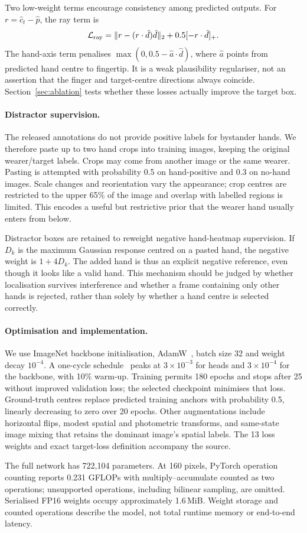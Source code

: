 Two low-weight terms encourage consistency among predicted outputs. For $r=\hat c_t-\hat p$, the ray term is
\begin{equation}
 \mathcal L_{\rm ray}
 =\|r-(r\cdot\hat d)\hat d\|_2
   +0.5[-r\cdot\hat d]_+ .
 \label{eq:rayloss}
\end{equation}
The hand-axis term penalises $\max(0,0.5-\hat a\cdot\hat d)$, where $\hat a$ points from predicted hand centre to fingertip. It is a weak plausibility regulariser, not an assertion that the finger and target-centre directions always coincide. Section~\ref{sec:ablation} tests whether these losses actually improve the target box.

\paragraph{Distractor supervision.}
The released annotations do not provide positive labels for bystander hands. We therefore paste up to two hand crops into training images, keeping the original wearer/target labels. Crops may come from another image or the same wearer. Pasting is attempted with probability 0.5 on hand-positive and 0.3 on no-hand images. Scale changes and reorientation vary the appearance; crop centres are restricted to the upper 65\% of the image and overlap with labelled regions is limited. This encodes a useful but restrictive prior that the wearer hand usually enters from below.

Distractor boxes are retained to reweight negative hand-heatmap supervision. If $D_k$ is the maximum Gaussian response centred on a pasted hand, the negative weight is $1+4D_k$. The added hand is thus an explicit negative reference, even though it looks like a valid hand. This mechanism should be judged by whether localisation survives interference and whether a frame containing only other hands is rejected, rather than solely by whether a hand centre is selected correctly.

\paragraph{Optimisation and implementation.}
We use ImageNet backbone initialisation, AdamW~\cite{loshchilov2019decoupled}, batch size 32 and weight decay $10^{-4}$. A one-cycle schedule~\cite{smith2019super} peaks at $3\times10^{-3}$ for heads and $3\times10^{-4}$ for the backbone, with 10\% warm-up. Training permits 180 epochs and stops after 25 without improved validation loss; the selected checkpoint minimises that loss. Ground-truth centres replace predicted training anchors with probability 0.5, linearly decreasing to zero over 20 epochs. Other augmentations include horizontal flips, modest spatial and photometric transforms, and same-state image mixing that retains the dominant image's spatial labels. The 13 loss weights and exact target-loss definition accompany the source.

The full network has 722,104 parameters. At 160 pixels, PyTorch operation counting reports 0.231 GFLOPs with multiply--accumulate counted as two operations; unsupported operations, including bilinear sampling, are omitted. Serialised FP16 weights occupy approximately 1.6\,MiB. Weight storage and counted operations describe the model, not total runtime memory or end-to-end latency.
